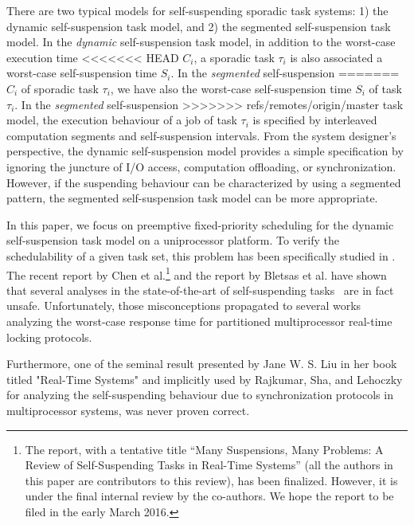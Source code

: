 There are two typical models for self-suspending sporadic task
systems: 1) the dynamic self-suspension task model, and 2) the
segmented self-suspension task model. In the \emph{dynamic}
self-suspension task model, in addition to the worst-case execution time
<<<<<<< HEAD
$C_i$, a sporadic task $\tau_i$ is also associated a worst-case
self-suspension time $S_i$. In the \emph{segmented} self-suspension
=======
$C_i$ of sporadic task $\tau_i$, we have also the worst-case
self-suspension time $S_i$ of task $\tau_i$. In the \emph{segmented} self-suspension
>>>>>>> refs/remotes/origin/master
task model, the execution behaviour of a job of task $\tau_i$ is
specified by interleaved computation segments and self-suspension
intervals.  From the system designer's perspective, the dynamic
self-suspension model provides a simple specification by ignoring the
juncture of I/O access, computation offloading, or
synchronization. However, if the suspending behaviour can be
characterized by using a segmented pattern, the segmented
self-suspension task model can be more appropriate.

In this paper, we focus on preemptive fixed-priority scheduling for
the dynamic self-suspension task model on a uniprocessor platform. To
verify the schedulability of a given task set, this problem has been
specifically studied in
\cite{RTCSA-KimCPKH95,MingLiRTCSA1994,ECRTS-AudsleyB04,RTAS-AudsleyB04,huangpass:dac2015}.
The recent report by Chen et al.\footnote{The report, with a tentative
  title ``Many Suspensions, Many Problems: A Review of
  Self-Suspending Tasks in Real-Time Systems'' (all the authors in
  this paper are contributors to this review), has been
  finalized. However, it is under the final internal review by the
  co-authors.  We hope the report to be filed in the early March
  2016.} and the report by Bletsas et al. \cite{BletsasReport2015}
have shown that several analyses in the state-of-the-art of self-suspending tasks~\cite{ECRTS-AudsleyB04,RTAS-AudsleyB04,RTCSA-KimCPKH95,MingLiRTCSA1994}
are in fact unsafe. Unfortunately, those misconceptions propagated to several works~\cite{zeng-2011,bbb-2013,yang-2013,kim-2014,han-2014,carminati-2014,yang-2014,lakshmanan-2009}
analyzing the worst-case response time for partitioned multiprocessor
real-time locking protocols.

Furthermore, one of the seminal result presented by Jane W. S. Liu in her book titled "Real-Time Systems"
\cite[p. 164-165]{Liu:2000:RS:518501} and implicitly used
by Rajkumar, Sha, and Lehoczky \cite[p.
267]{DBLP:conf/rtss/RajkumarSL88} for analyzing the self-suspending
behaviour due to synchronization protocols in multiprocessor systems, was never proven correct.


